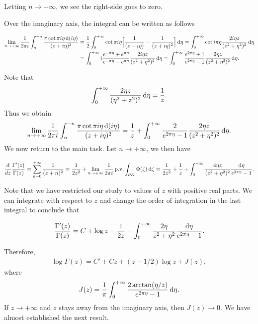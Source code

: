 Letting $n\to+\infty$, we see the right-side goes to zero.\par
Over the imaginary axis, the integral can be written as follows
\begin{small}
\begin{align*}
\lim_{n\to+\infty}\frac{1}{2\pi i}\int_{n}^{-n}\frac{\pi\cot\pi i\eta\mathop{}\!\mathrm{d}(i\eta)}{(z+i\eta)^2}&=\frac{1}{2}\int_{0}^{+\infty}\cot\pi i\eta\Big[\frac{1}{(z-i\eta)}-\frac{1}{(z+i\eta)^2}\Big]\mathop{}\!\mathrm{d}\eta=\int_{0}^{+\infty}\cot i\pi\eta\frac{2i\eta z}{(z^2+\eta^2)^2}\mathop{}\!\mathrm{d}\eta\\
&=\int_{0}^{+\infty}i\frac{e^{-\pi\eta}+e^{\pi\eta}}{e^{-\pi\eta}-e^{\pi\eta}}\frac{2i\eta z}{(z^2+\eta^2)^2}\mathop{}\!\mathrm{d}\eta=\int_{0}^{+\infty}\frac{e^{2\pi\eta}+1}{e^{2\pi\eta}-1}\frac{2\eta z}{(z^2+\eta^2)^2}\mathop{}\!\mathrm{d}\eta.
\end{align*}
\end{small}
Note that
\[\int_{0}^{+\infty}\frac{2\eta z}{(\eta^2+z^2)^2}\mathop{}\!\mathrm{d}\eta=\frac{1}{z}.\]
Thus we obtain
\[\lim_{n\to+\infty}\frac{1}{2\pi i}\int_{n}^{-n}\frac{\pi\cot\pi i\eta\mathop{}\!\mathrm{d}(i\eta)}{(z+i\eta)^2}=\frac{1}{z}+\int_{0}^{+\infty}\frac{2}{e^{2\pi\eta}-1}\frac{2\eta z}{(z^2+\eta^2)^2}\mathop{}\!\mathrm{d}\eta.\]
We now return to the main task. Let $n\to+\infty$, we then have
\begin{small}
\begin{align*}
\frac{d}{dz}\frac{\Gamma'(z)}{\Gamma(z)}=\sum_{n=0}^{+\infty}\frac{1}{(z+n)^2}=\frac{1}{2z^2}+\lim_{n\to+\infty}\frac{1}{2\pi i}\,\mathrm{ p.v.}\int_{\partial K}\Phi(\zeta)\mathop{}\!\mathrm{d}\zeta=\frac{1}{2z^2}+\frac{1}{z}+\int_{0}^{+\infty}\frac{4\eta z}{(z^2+\eta^2)^2}\frac{\mathop{}\!\mathrm{d}\eta}{e^{2\pi\eta}-1}.
\end{align*}
\end{small}
Note that we have restricted our study to values of $z$ with positive real parts. We can integrate with respect to $z$ and change the order of integration in the last integral to conclude that
\begin{small}
\begin{align*}
\frac{\Gamma'(z)}{\Gamma(z)}=C+\log z-\frac{1}{2z}-\int_{0}^{+\infty}\frac{2\eta}{z^2+\eta^2}\frac{\mathop{}\!\mathrm{d}\eta}{e^{2\pi\eta}-1}.
\end{align*}
\end{small}
Therefore,
\begin{align}\label{log Gamma expression}
\log\Gamma(z)=C'+Cz+(z-1/2)\log z+J(z),
\end{align}
where
\[J(z)=\frac{1}{\pi}\int_{0}^{+\infty}\frac{2\arctan(\eta/z)}{e^{2\pi\eta}-1}\mathop{}\!\mathrm{d}\eta.\]
If $z\to+\infty$ and $z$ stays away from the imaginary axis, then $J(z)\to 0$. We have almost established the next result.
